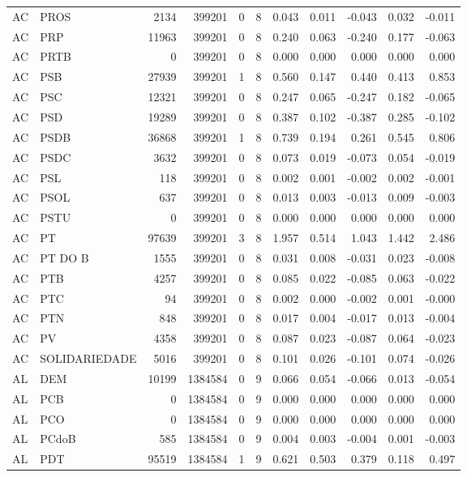 \begin{landscape}
\begin{longtable}{llrrrrrrrrr}
AC & PROS & 2134 & 399201 & 0 & 8 & 0.043 & 0.011 & -0.043 & 0.032 & -0.011 \\
AC & PRP & 11963 & 399201 & 0 & 8 & 0.240 & 0.063 & -0.240 & 0.177 & -0.063 \\
AC & PRTB & 0 & 399201 & 0 & 8 & 0.000 & 0.000 & 0.000 & 0.000 & 0.000 \\
AC & PSB & 27939 & 399201 & 1 & 8 & 0.560 & 0.147 & 0.440 & 0.413 & 0.853 \\
AC & PSC & 12321 & 399201 & 0 & 8 & 0.247 & 0.065 & -0.247 & 0.182 & -0.065 \\
AC & PSD & 19289 & 399201 & 0 & 8 & 0.387 & 0.102 & -0.387 & 0.285 & -0.102 \\
AC & PSDB & 36868 & 399201 & 1 & 8 & 0.739 & 0.194 & 0.261 & 0.545 & 0.806 \\
AC & PSDC & 3632 & 399201 & 0 & 8 & 0.073 & 0.019 & -0.073 & 0.054 & -0.019 \\
AC & PSL & 118 & 399201 & 0 & 8 & 0.002 & 0.001 & -0.002 & 0.002 & -0.001 \\
AC & PSOL & 637 & 399201 & 0 & 8 & 0.013 & 0.003 & -0.013 & 0.009 & -0.003 \\
AC & PSTU & 0 & 399201 & 0 & 8 & 0.000 & 0.000 & 0.000 & 0.000 & 0.000 \\
AC & PT & 97639 & 399201 & 3 & 8 & 1.957 & 0.514 & 1.043 & 1.442 & 2.486 \\
AC & PT DO B & 1555 & 399201 & 0 & 8 & 0.031 & 0.008 & -0.031 & 0.023 & -0.008 \\
AC & PTB & 4257 & 399201 & 0 & 8 & 0.085 & 0.022 & -0.085 & 0.063 & -0.022 \\
AC & PTC & 94 & 399201 & 0 & 8 & 0.002 & 0.000 & -0.002 & 0.001 & -0.000 \\
AC & PTN & 848 & 399201 & 0 & 8 & 0.017 & 0.004 & -0.017 & 0.013 & -0.004 \\
AC & PV & 4358 & 399201 & 0 & 8 & 0.087 & 0.023 & -0.087 & 0.064 & -0.023 \\
AC & SOLIDARIEDADE & 5016 & 399201 & 0 & 8 & 0.101 & 0.026 & -0.101 & 0.074 & -0.026 \\
AL & DEM & 10199 & 1384584 & 0 & 9 & 0.066 & 0.054 & -0.066 & 0.013 & -0.054 \\
AL & PCB & 0 & 1384584 & 0 & 9 & 0.000 & 0.000 & 0.000 & 0.000 & 0.000 \\
AL & PCO & 0 & 1384584 & 0 & 9 & 0.000 & 0.000 & 0.000 & 0.000 & 0.000 \\
AL & PCdoB & 585 & 1384584 & 0 & 9 & 0.004 & 0.003 & -0.004 & 0.001 & -0.003 \\
AL & PDT & 95519 & 1384584 & 1 & 9 & 0.621 & 0.503 & 0.379 & 0.118 & 0.497 \\

\end{longtable}
\end{landscape}

